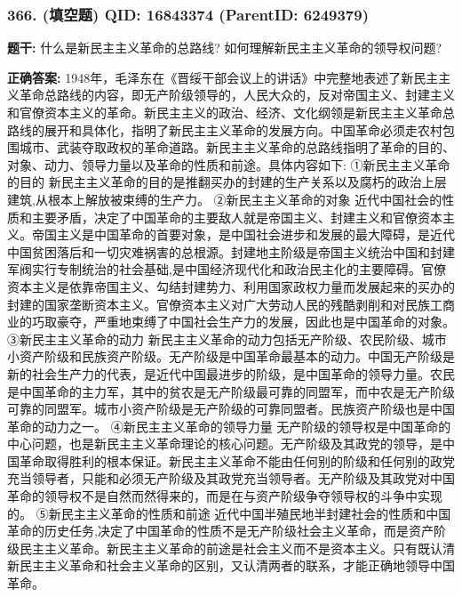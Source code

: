 \documentclass[12pt,UTF8]{ctexart}
\begin{document}
\vspace{0.3em}\hrulefill\vspace{0.7em}

\subsubsection*{366. (填空题) \small QID: 16843374 (ParentID: 6249379)}

\textbf{题干:}
什么是新民主主义革命的总路线? 如何理解新民主主义革命的领导权问题?



\textbf{正确答案:}
1948年，毛泽东在《晋绥干部会议上的讲话》中完整地表述了新民主主义革命总路线的内容，即无产阶级领导的，人民大众的，反对帝国主义、封建主义和官僚资本主义的革命。新民主主义的政治、经济、文化纲领是新民主主义革命总路线的展开和具体化，指明了新民主主义革命的发展方向。中国革命必须走农村包围城市、武装夺取政权的革命道路。新民主主义革命的总路线指明了革命的目的、对象、动力、领导力量以及革命的性质和前途。具体内容如下:
①新民主主义革命的目的
新民主主义革命的目的是推翻买办的封建的生产关系以及腐朽的政治上层建筑,从根本上解放被束缚的生产力。
②新民主主义革命的对象
近代中国社会的性质和主要矛盾，决定了中国革命的主要敌人就是帝国主义、封建主义和官僚资本主义。帝国主义是中国革命的首要对象，是中国社会进步和发展的最大障碍，是近代中国贫困落后和一切灾难祸害的总根源。封建地主阶级是帝国主义统治中国和封建军阀实行专制统治的社会基础,是中国经济现代化和政治民主化的主要障碍。官僚资本主义是依靠帝国主义、勾结封建势力、利用国家政权力量而发展起来的买办的封建的国家垄断资本主义。官僚资本主义对广大劳动人民的残酷剥削和对民族工商业的巧取豪夺，严重地束缚了中国社会生产力的发展，因此也是中国革命的对象。
③新民主主义革命的动力
新民主主义革命的动力包括无产阶级、农民阶级、城市小资产阶级和民族资产阶级。无产阶级是中国革命最基本的动力。中国无产阶级是新的社会生产力的代表，是近代中国最进步的阶级，是中国革命的领导力量。农民是中国革命的主力军，其中的贫农是无产阶级最可靠的同盟军，而中农是无产阶级可靠的同盟军。城市小资产阶级是无产阶级的可靠同盟者。民族资产阶级也是中国革命的动力之一。
④新民主主义革命的领导力量
无产阶级的领导权是中国革命的中心问题，也是新民主主义革命理论的核心问题。无产阶级及其政党的领导，是中国革命取得胜利的根本保证。新民主主义革命不能由任何别的阶级和任何别的政党充当领导者，只能和必须无产阶级及其政党充当领导者。无产阶级及其政党对中国革命的领导权不是自然而然得来的，而是在与资产阶级争夺领导权的斗争中实现的。
⑤新民主主义革命的性质和前途
近代中国半殖民地半封建社会的性质和中国革命的历史任务,决定了中国革命的性质不是无产阶级社会主义革命，而是资产阶级民主主义革命。新民主主义革命的前途是社会主义而不是资本主义。只有既认清新民主主义革命和社会主义革命的区别，又认清两者的联系，才能正确地领导中国革命。
\end{document}
